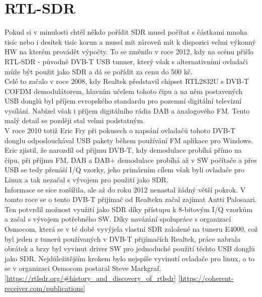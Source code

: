 \documentclass{ctuthesis}
\begin{document}
\section{RTL-SDR}
Pokud si v minulosti chtěl někdo pořídit SDR musel počítat s částkami mnoha tisíc nebo i desítek tisíc korun a musel mít zároveň mít k dispozici velmi výkonný HW na kterém provádět výpočty. To se změnilo v roce 2012, kdy na scénu přišlo RTL-SDR - původně DVB-T USB tunner, který však s alternativními ovladači může být použit jako SDR a dá se pořídit za cenu do 500 kč.\\
Celé to začalo v roce 2008, kdy Realtek představil chipset RTL2832U s  DVB-T COFDM demodulátorem, hlavním učelem tohoto čipu a na něm postavených USB donglů byl příjem evropského standardu pro pozemní digitální televizní vysílání. Nabízel však i příjem digitálního rádia DAB a analogového FM. Tento malý detail se později stal velmi podstatným.\\
V roce 2010 totiž Eric Fry při pokusech o napsání ovladačů tohoto DVB-T donglu odposlouchával USB pakety během používání FM aplikace pro Windows. Eric zjistil, že narozdíl od přijmu DVB-T, kdy demodulace probíhá přímo na čipu, při příjmu FM, DAB a DAB+ demodulace probíhá až v SW počítače a přes USB se tedy přenáší I/Q vzorky, jeho primárním cílem však byli ovladače pro Linux a tak nezačal s vývojem pro použití jako SDR.\\
Informace se sice rozšířila, ale až do roku 2012 nenastal žádný větší pokrok. V tomto roce se o tento DVB-T přijímač od Realteku začal zajímat Antti Palosaari. Ten potvrdil možnost využití jako SDR díky přístupu k 8-bitovým I/Q vzorkům a začal s vývojem potřebného SW. Díky navázání spolupráce s organizací Osmocom, která se v té době vyvýjela vlastní SDR založené na tuneru E4000, což byl jeden z tunerů používaných v DVB-T přijímačích Realtek, práce nabrala obrátek a brzy byl vyvinut driver SW pro jednoduché použití těchto USB donglů jako SDR. Nejdůležitějším krokem bylo nejspíše vyvinutí ovladače pro linux, o to se v organizaci Osmocom postaral Steve Markgraf.
\ref{https://rtlsdr.org/#history_and_discovery_of_rtlsdr}
\ref{https://coherent-receiver.com/publications}
\\
\end{document}
